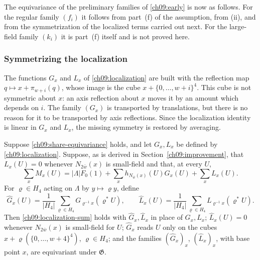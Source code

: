 The equivariance of the preliminary families of \eqref{ch09:early}
is now as follows. For the regular family $(f_i)$ it follows from
part~(f) of the assumption, from (ii), and from the symmetrization of
the localized terms carried out next. For the large-field family
$(k_i)$ it is part~(f) itself and is not proved here.

\subsubsection*{Symmetrizing the localization}

The functions $G_x$ and $L_x$ of \eqref{ch09:localization} are built
with the reflection map $q\mapsto x+\pi_{w+i}(q)$, whose image is the cube
$x+\{0,\ldots,w+i\}^4$. This cube is not symmetric about $x$: an axis
reflection about $x$ moves it by an amount which depends on $i$. The
family $(G_x)$ is transported by translations, but there is no reason
for it to be transported by axis reflections. Since the localization
identity is linear in $G_x$ and $L_x$, the missing symmetry is restored
by averaging.

\begin{lemma}
\label{ch09:symmetric-localization}
Suppose \eqref{ch09:share-equivariance} holds, and let $G_x,L_x$ be
defined by \eqref{ch09:localization}. Suppose, as is derived in
Section~\ref{ch09:improvement}, that
$L_x(U)=0$ whenever $N_{2\bar w}(x)$ is small-field and that, at every
$U$,
\begin{equation}
 \sum_xM_x(U)=|\Lambda|F_0(1)
   +\sum_xh_{N_{\bar w}(x)}(U)G_x(U)+\sum_xL_x(U).
 \label{ch09:localization-sum}
\end{equation}
For $\varrho\in H_4$ acting on $\Lambda$ by $y\mapsto\varrho y$, define
\[
 \widehat G_x(U)=\frac1{|H_4|}\sum_{\varrho\in H_4}
                        G_{\varrho^{-1}x}(\varrho^*U),
 \qquad
 \widehat L_x(U)=\frac1{|H_4|}\sum_{\varrho\in H_4}
                        L_{\varrho^{-1}x}(\varrho^*U).
\]
Then \eqref{ch09:localization-sum} holds with
$\widehat G_x,\widehat L_x$ in place of $G_x,L_x$;
$\widehat L_x(U)=0$ whenever $N_{2\bar w}(x)$ is small-field for $U$;
$\widehat G_x$ reads $U$ only on the cubes
$x+\varrho(\{0,\ldots,w+4\}^4)$, $\varrho\in H_4$; and the
families $(\widehat G_x)_x$, $(\widehat L_x)_x$, with base point $x$, are
equivariant under $\mathfrak G$.
\end{lemma}


